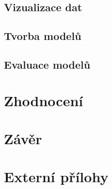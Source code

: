 \documentclass[male,czech,api_ing]{thesis}
\begin{document}
\section{Vizualizace dat}

\section{Tvorba modelů}

\section{Evaluace modelů}

\chapter{Zhodnocení} 

\chapter{Závěr}

\printbibliography[title=Seznam použitých zdrojů]

\listoffigures

\lstlistoflistings

\appendix

\chapter{Externí přílohy\label{sec:ep}}



\end{document}
